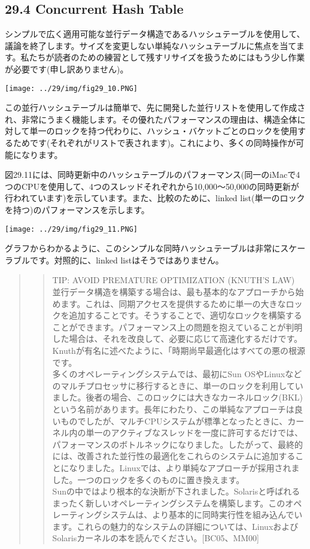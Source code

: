\hypertarget{concurrent-hash-table}{%
\subsection*{29.4 Concurrent Hash Table}\label{concurrent-hash-table}}

シンプルで広く適用可能な並行データ構造であるハッシュテーブルを使用して、議論を終了します。サイズを変更しない単純なハッシュテーブルに焦点を当てます。私たちが読者のための練習として残すリサイズを扱うためにはもう少し作業が必要です(申し訳ありません)。

\texttt{[image: ../29/img/fig29\_10.PNG]}

この並行ハッシュテーブルは簡単で、先に開発した並行リストを使用して作成され、非常にうまく機能します。その優れたパフォーマンスの理由は、構造全体に対して単一のロックを持つ代わりに、ハッシュ・バケットごとのロックを使用するためです(それぞれがリストで表されます)。これにより、多くの同時操作が可能になります。

図29.11には、同時更新中のハッシュテーブルのパフォーマンス(同一のiMacで4つのCPUを使用して、4つのスレッドそれぞれから10,000〜50,000の同時更新が行われています)を示しています。また、比較のために、linked
list(単一のロックを持つ)のパフォーマンスを示します。

\texttt{[image: ../29/img/fig29\_11.PNG]}

グラフからわかるように、このシンプルな同時ハッシュテーブルは非常にスケーラブルです。対照的に、linked
listはそうではありません。

\begin{quote}
\begin{quote}
TIP: AVOID PREMATURE OPTIMIZATION (KNUTH'S LAW)\\
並行データ構造を構築する場合は、最も基本的なアプローチから始めます。これは、同期アクセスを提供するために単一の大きなロックを追加することです。そうすることで、適切なロックを構築することができます。パフォーマンス上の問題を抱えていることが判明した場合は、それを改良して、必要に応じて高速化するだけです。Knuthが有名に述べたように、「時期尚早最適化はすべての悪の根源です。\\
多くのオペレーティングシステムでは、最初にSun
OSやLinuxなどのマルチプロセッサに移行するときに、単一のロックを利用していました。後者の場合、このロックには大きなカーネルロック(BKL)という名前があります。長年にわたり、この単純なアプローチは良いものでしたが、マルチCPUシステムが標準となったときに、カーネル内の単一のアクティブなスレッドを一度に許可するだけでは、パフォーマンスのボトルネックになりました。したがって、最終的には、改善された並行性の最適化をこれらのシステムに追加することになりました。Linuxでは、より単純なアプローチが採用されました。一つのロックを多くのものに置き換えます。\\
Sunの中ではより根本的な決断が下されました。Solarisと呼ばれるまったく新しいオペレーティングシステムを構築します。このオペレーティングシステムは、より基本的に同時実行性を組み込んでいます。これらの魅力的なシステムの詳細については、LinuxおよびSolarisカーネルの本を読んでください。{[}BC05、MM00{]}
\end{quote}
\end{quote}

